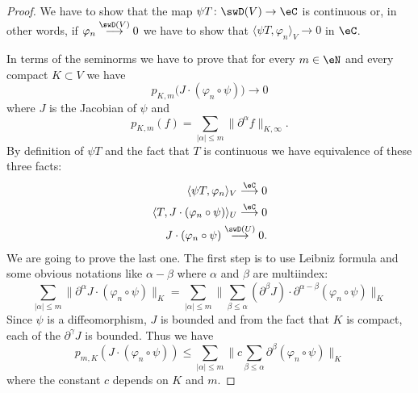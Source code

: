 \begin{proof}
	We have to show that the map \( \psi T\colon \swD(V)\to \eC\) is continuous or, in other words, if \( \varphi_n\stackrel{\swD(V)}{\longrightarrow}0\) we have to show that \( \langle \psi T, \varphi_n\rangle_V\to 0\) in \( \eC\).

	In terms of the seminorms we have to prove that for every \( m\in \eN\) and every compact \( K\subset V\) we have
	\begin{equation}
		p_{K,m}\big( J\cdot(\varphi_n\circ \psi) \big)\to 0
	\end{equation}
	where \( J\) is the Jacobian of \( \psi\) and
	\begin{equation}
		p_{K,m}(f)=\sum_{| \alpha |\leq m}\| \partial^{\alpha}f \|_{K,\infty}.
	\end{equation}
	By definition of \( \psi T\) and the fact that \( T\) is continuous we have equivalence of these three facts:
	\begin{subequations}
		\begin{align}
			\langle \psi T, \varphi_n\rangle_V\stackrel{\eC}{\longrightarrow}0                  \\
			\langle  T, J\cdot (\varphi_n\circ \psi)  \rangle_U\stackrel{\eC}{\longrightarrow}0 \\
			J\cdot(\varphi_n\circ\psi)\stackrel{\swD(U)}{\longrightarrow}0.
		\end{align}
	\end{subequations}
	We are going to prove the last one. The first step is to use Leibniz formula and some obvious notations like \( \alpha-\beta\) where \( \alpha\) and \( \beta\) are multiindex:
	\begin{equation}
		\sum_{| \alpha |\leq m}\| \partial^{\alpha}J\cdot(\varphi_n\circ\psi) \|_{K}=\sum_{| \alpha |\leq m}\| \sum_{\beta\leq \alpha}(\partial^{\beta}J)\cdot \partial^{\alpha-\beta}(\varphi_n\circ\psi) \|_K
	\end{equation}
	Since \( \psi\) is a diffeomorphism, \( J\) is bounded and from the fact that \( K\) is compact, each of the \( \partial^{\gamma}J\) is bounded. Thus we have
	\begin{equation}
		p_{m,K}(J\cdot (\varphi_n\circ \psi))\leq \sum_{| \alpha |\leq m}\|c \sum_{\beta\leq \alpha} \partial^{\beta}(\varphi_n\circ\psi) \|_{K}
	\end{equation}
	where the constant \( c\) depends on \( K\) and \( m\).


\end{proof}
